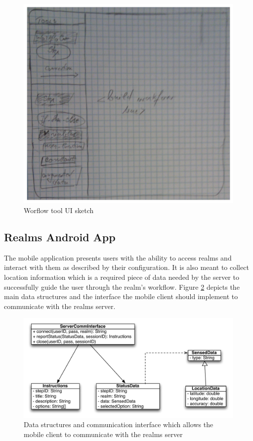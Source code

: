 \\\\
\begin{figure}[H]
	\centering
	\includegraphics[width=0.9\linewidth]{fig/workflow_sketch}
	\caption{Worflow tool UI sketch}
	\label{fig.design.workflow_sketch}
\end{figure}

\subsection{Realms Android App} %
\label{sub:realms_android_app}
The mobile application presents users with the ability to access realms and interact with them as described by their configuration. It is also meant to collect location information which is a required piece of data needed by the server to successfully guide the user through the realm's workflow. Figure \ref{fig.design.mobile_client} depicts the main data structures and the interface the mobile client should implement to communicate with the realms server.
\begin{figure}[H]
	\centering
	\includegraphics[width=0.9\linewidth]{fig/mobile_client}
	\caption{Data structures and communication interface which allows the mobile client to communicate with the realms server}
	\label{fig.design.mobile_client}
\end{figure}

